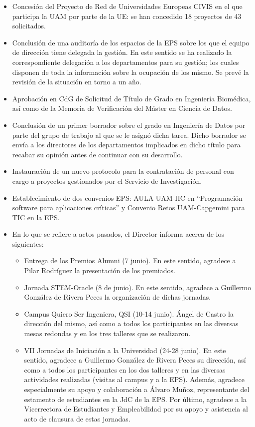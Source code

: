\documentclass[numerado]{plantillasEPS} %
\begin{document}
\begin{itemize}
    \item Concesión del Proyecto de Red de Universidades Europeas CIVIS en el que participa la UAM por parte de la UE: se han concedido 18 proyectos de 43 solicitados. 
    \item Conclusión  de una  auditoría  de  los espacios  de  la  EPS  sobre  los  que  el  equipo  de dirección    tiene    delegada    la    gestión.    En    este    sentido    se    ha    realizado la correspondiente   delegación   a   los departamentos   para su   gestión;   los   cuales disponen  de  toda la  información  sobre  la  ocupación de  los  mismo.  Se  prevé  la revisión de la situación en torno a un año. 
    \item Aprobación  en  CdG de  Solicitud  de  Título  de  Grado  en  Ingeniería  Biomédica,  así como de la Memoria de Verificación del Máster en Ciencia de Datos. 
    \item Conclusión  de  un  primer  borrador  sobre  el  grado  en Ingeniería  de  Datos  por  parte del  grupo  de  trabajo  al  que  se  le  asignó  dicha  tarea.  Dicho  borrador se  envía  a  los directores de los departamentos implicados en dicho título para recabar su opinión antes de continuar con su desarrollo.
    \item Instauración  de  un  nuevo  protocolo  para la contratación de  personal con  cargo  a proyectos gestionados por el Servicio de Investigación.
    \item Establecimiento  de  dos convenios  EPS:  AULA  UAM-IIC en “Programación software para aplicaciones críticas” y Convenio Retos UAM-Capgemini para TIC en la EPS.
    \item En lo que se refiere a actos pasados, el Director informa acerca de los siguientes:
    
    \begin{itemize}
        \item Entrega  de  los  Premios  Alumni  (7  junio).  En  este  sentido,  agradece  a  Pilar Rodríguez la presentación de los premiados.
        \item Jornada  STEM-Oracle  (8  de  junio).  En  este  sentido,  agradece  a  Guillermo González de Rivera Peces la organización de dichas jornadas.
        \item Campus Quiero Ser Ingeniera, QSI (10-14 junio). Ángel de Castro la dirección del   mismo,   así   como a   todos   los   participantes   en   las   diversas   mesas redondas y en los tres talleres que se realizaron.
        \item VII  Jornadas  de  Iniciación  a  la  Universidad  (24-28  junio).  En  este  sentido, agradece a  Guillermo  González  de  Rivera  Peces  su  dirección,  así  como  a todos  los  participantes  en  los  dos  talleres  y  en  las  diversas  actividades realizadas (visitas al campus y a la EPS). Además, agradece especialmente su apoyo  y  colaboración  a Álvaro  Muñoz,  representante  del  estamento  de estudiantes  en  la  JdC  de  la  EPS. Por  último,  agradece  a  la  Vicerrectora  de Estudiantes y Empleabilidad por su apoyo y asistencia al acto de clausura de estas jornadas.
    \end{itemize}
    

\end{itemize}
\end{document}
